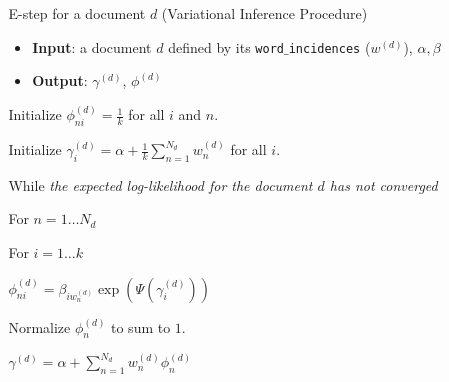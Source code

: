 \documentclass[final]{beamer}
\newlength{\onecolwid}
\newlength{\twocolwid}
\begin{document}
\begin{frame}[t]
\begin{columns}[t]
\begin{column}{\twocolwid}
\begin{columns}[t,totalwidth=\twocolwid]
\begin{column}{\onecolwid}

\end{column} %

\begin{column}{\onecolwid}\vspace{-.6in} %

% 

\begin{block}{E-step for a document $d$ (Variational Inference Procedure)}

\begin{itemize}
  \item \textbf{Input}: a document $d$ defined by its \texttt{word$\_$incidences} ($w^{(d)}$), $\alpha, \beta$
  \item \textbf{Output}: $\gamma^{(d)}$, $\phi^{(d)}$
\end{itemize}

\medskip

Initialize $\phi_{ni}^{(d)} = \frac{1}{k}$ for all $i$ and $n$.

Initialize $\gamma_i^{(d)} = \alpha + \frac{1}{k}\sum_{n=1}^{N_d} w_n^{(d)}$ for all $i$.

While {\emph{the expected log-likelihood for the document $d$ has not converged}}{

\quad For {$n=1\ldots N_d$}{

\quad\quad For {$i=1\ldots k$}{

\quad\quad\quad $\phi_{ni}^{(d)} = \beta_{iw_n^{(d)}}\exp(\Psi(\gamma_i^{(d)}))$

}

\quad Normalize $\phi_n^{(d)}$ to sum to $1$.
}

\quad $\gamma^{(d)} = \alpha + \sum_{n=1}^{N_d} w_n^{(d)} \phi_n^{(d)}$
}

\end{block}


\end{column} %

\end{columns} %


\end{column}
\end{columns}
\end{frame}
\end{document}
